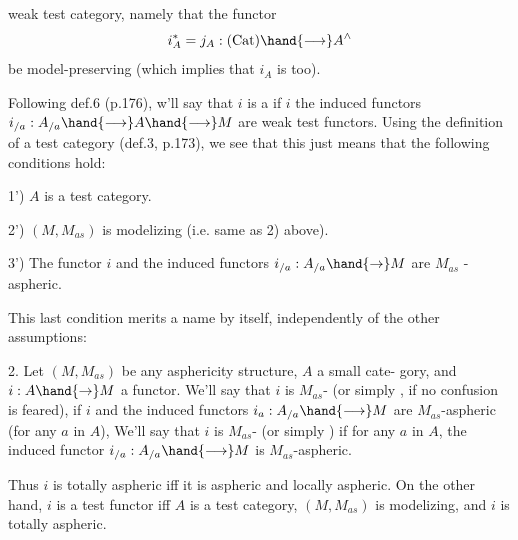 
weak test category, namely that the functor
\[ i^{*}_{A} = j_{A} : (\mathrm{Cat}) \hand{\longrightarrow} A^{\wedge} \]
be model-preserving (which implies that $i_{A}$ is too).

Following def.6 (p.176), w'll say that $i$ is a \hand{\uline{\textcolor{black}{test}}} \hand{\uline{\textcolor{black}{functor}}} if $i$
\hand{\uline{\textcolor{black}{and}}} the induced functors $i_{/a} : A_{/a} \hand{\longrightarrow} A \hand{\longrightarrow} M$ are weak test functors.
Using the definition of a test category (def.3, p.173), we see that this
just means that the following conditions hold:

1') $A$ is a test category.

2') $(M,M_{as})$ is modelizing (i.e. same as 2) above).

3') The functor $i$ and the induced functors $i_{/a} : A_{/a} \hand{\rightarrow} M$ are 
$M_{as}$ - aspheric.

This last condition merits a name by itself, independently of the
other assumptions:

\hand{\uline{\textcolor{black}{Definition}}} 2. Let $(M,M_{as})$ be any asphericity structure, $A$ a small cate-%
gory, and $i: A \hand{\rightarrow} M$ a functor. We'll say that $i$ is \hand{\uline{\textcolor{black}{totally}}} $M_{as}$-\hand{\uline{\textcolor{black}{aspheric}}}
(or simply \hand{\uline{\textcolor{black}{totally}}} \hand{\uline{\textcolor{black}{aspheric}}} , if no confusion is feared), if $i$ and 
the induced functors $i_{a} : A_{/a} \hand{\longrightarrow} M$ are $M_{as}$-aspheric (for any $a$ in $A$),
We'll say that $i$ is \hand{\uline{\textcolor{black}{locally}}} $M_{as}$-\hand{\uline{\textcolor{black}{aspheric}}} (or simply \hand{\uline{\textcolor{black}{locally}}} \hand{\uline{\textcolor{black}{aspheric}}})
if for any $a$ in $A$, the induced functor $i_{/a} : A_{/a} \hand{\longrightarrow} M$ is $M_{as}$-aspheric.

Thus $i$ is totally aspheric iff it is aspheric and locally aspheric.
On the other hand, $i$ is a test functor iff $A$ is a test category, $(M,M_{as})$
is modelizing, and $i$ is totally aspheric.

